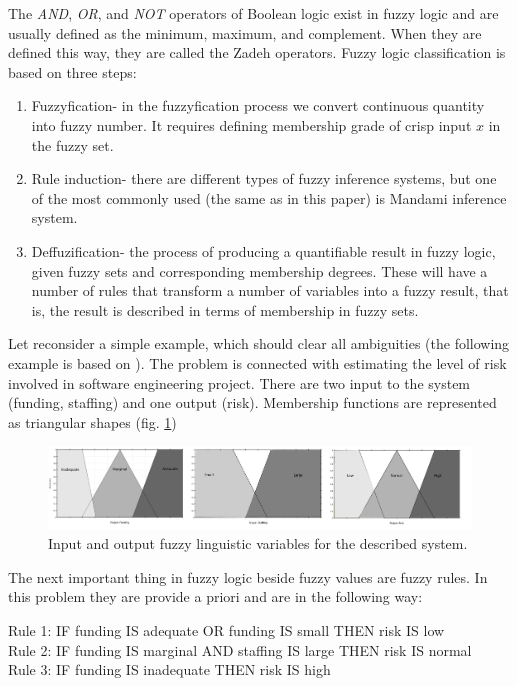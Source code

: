 The \textit{AND}, \textit{OR}, and \textit{NOT} operators of 
Boolean logic exist in fuzzy logic and are usually defined as the minimum, maximum,
and complement. When they are defined this way, they are called the Zadeh operators.
Fuzzy logic classification is based  on three steps:
\begin{enumerate}
    \item Fuzzyfication- in the fuzzyfication process we 
        convert continuous quantity into fuzzy number. It requires defining
        membership grade of crisp input $x$ in the fuzzy set.
    \item Rule induction- there are different types of fuzzy inference systems,
        but one of the most commonly used (the same as in this paper) is
        Mandami inference system.
    \item Deffuzification- the process of producing a quantifiable result in fuzzy logic,
        given fuzzy sets and corresponding membership degrees. These will have a number of
        rules that transform a number of variables into a fuzzy result, that is, the result 
         is described in terms of membership in fuzzy sets. 
\end{enumerate}
Let reconsider a simple example, which should clear all ambiguities (the following 
example is based on \cite{bib20}). The problem is connected with estimating the
level of risk involved in software engineering project. There are two input
to the system (funding, staffing) and one output
(risk). Membership functions are represented as triangular shapes (fig. \ref{fig:fuzzy_example_1}) 
\begin{figure}[H]
    \begin{center}
        \includegraphics[width=\textwidth]{fig/fuzzy_example_1.png}
    \end{center}
    \caption{Input and output fuzzy linguistic variables for the described
    system.}
    \label{fig:fuzzy_example_1}
\end{figure}
The next important thing in fuzzy logic beside fuzzy values are fuzzy rules. In
this problem they are provide a priori and are in the following way:
\begin{table}[H]
    Rule 1: IF funding IS adequate OR funding IS small THEN risk IS
    low \\
    Rule 2: IF funding IS marginal AND staffing IS large THEN risk IS
    normal \\
    Rule 3: IF funding IS inadequate THEN risk IS high
\end{table}

